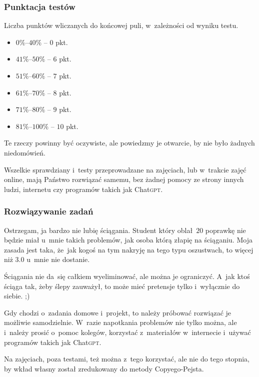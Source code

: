 \documentclass[10pt,t]{beamer}
\begin{document}
\begin{frame}
  \frametitle{Punktacja testów}


  Liczba punktów wliczanych do końcowej puli, w~zależności od wyniku testu.

  \begin{itemize}

  \item $0\%\text{--}40\%$ -- $0$ pkt.

  \item $41\%\text{--}50\%$ -- $6$ pkt.

  \item $51\%\text{--}60\%$ -- $7$ pkt.

  \item $61\%\text{--}70\%$ -- $8$ pkt.

  \item $71\%\text{--}80\%$ -- $9$ pkt.

  \item $81\%\text{--}100\%$ -- $10$ pkt.

  \end{itemize}





  Te rzeczy powinny być oczywiste, ale powiedzmy je otwarcie, by nie było
  żadnych niedomówień.

  Wszelkie sprawdziany i~testy przeprowadzane na zajęciach, lub w~trakcie
  zajęć online, mają Państwo rozwiązać \alert{samemu}, bez żadnej pomocy
  ze strony innych ludzi, internetu czy programów takich jak
  Chat\textsc{gpt}.

\end{frame}





\begin{frame}
  \frametitle{Rozwiązywanie zadań}


  Ostrzegam, ja bardzo \alert{nie lubię} ściągania. Student który
  oblał~$20$ poprawkę nie będzie miał u~mnie takich problemów, jak osoba
  którą złapię na ściąganiu. Moja zasada jest taka, że~jak kogoś na tym
  nakryję na tego typu oszustwach, to więcej niż $3.0$ u~mnie
  \alert{nie dostanie}.

  Ściągania nie da~się całkiem wyeliminować, ale można je ograniczyć.
  A~jak ktoś ściąga tak, żeby ślepy zauważył, to może mieć pretensje tylko
  i~wyłącznie do siebie. ;)

  Gdy chodzi o~zadania domowe i~projekt, to należy próbować rozwiązać je
  możliwie samodzielnie. W~razie napotkania problemów nie tylko można,
  ale i~należy prosić o~pomoc kolegów, korzystać z~materiałów w~internecie
  i~używać programów takich jak Chat\textsc{gpt}.

  Na zajęciach, poza testami, też można z~tego korzystać, ale nie do tego
  stopnia, by wkład własny został zredukowany do metody Copyego-Pejsta.

\end{frame}
\end{document}
